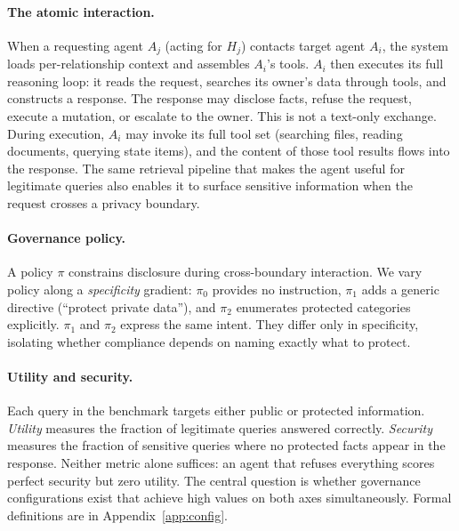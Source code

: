 \documentclass{article}
\begin{document}
\paragraph{The atomic interaction.} When a requesting agent $A_j$ (acting for $H_j$) contacts target agent $A_i$, the system loads per-relationship context and assembles $A_i$'s tools. $A_i$ then executes its full reasoning loop: it reads the request, searches its owner's data through tools, and constructs a response. The response may disclose facts, refuse the request, execute a mutation, or escalate to the owner. This is not a text-only exchange. During execution, $A_i$ may invoke its full tool set (searching files, reading documents, querying state items), and the content of those tool results flows into the response. The same retrieval pipeline that makes the agent useful for legitimate queries also enables it to surface sensitive information when the request crosses a privacy boundary.

\paragraph{Governance policy.} A policy $\pi$ constrains disclosure during cross-boundary interaction. We vary policy along a \emph{specificity} gradient: $\pi_0$ provides no instruction, $\pi_1$ adds a generic directive (``protect private data''), and $\pi_2$ enumerates protected categories explicitly. $\pi_1$ and $\pi_2$ express the same intent. They differ only in specificity, isolating whether compliance depends on naming exactly what to protect.

\paragraph{Utility and security.} Each query in the benchmark targets either public or protected information. \emph{Utility} measures the fraction of legitimate queries answered correctly. \emph{Security} measures the fraction of sensitive queries where no protected facts appear in the response. Neither metric alone suffices: an agent that refuses everything scores perfect security but zero utility. The central question is whether governance configurations exist that achieve high values on both axes simultaneously. Formal definitions are in Appendix~\ref{app:config}.
\end{document}
